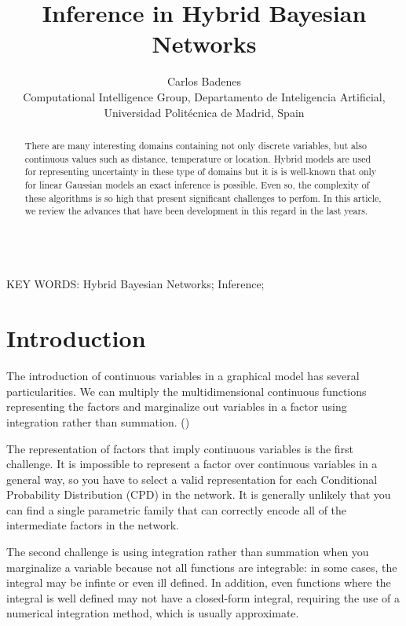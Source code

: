 \documentclass[a4paper,11pt]{article}
\begin{document}
\title{Inference in Hybrid Bayesian Networks}

\author{{Carlos Badenes}\\
{\small Computational Intelligence Group, Departamento de Inteligencia Artificial, Universidad Polit\'ecnica de Madrid, Spain}}

\date{}
\maketitle



\begin{abstract} There are many interesting domains containing not only discrete variables, but also continuous values such as distance, temperature or location. Hybrid models are used for representing uncertainty in these type of domains but it is is well-known that only for linear Gaussian models an exact inference is possible. Even so, the complexity of these algorithms is so high that present significant challenges to perfom. In this article, we review the advances that have been development in this regard in the last years.
\end{abstract}


\ \\
KEY WORDS: Hybrid Bayesian Networks; Inference;




\section{Introduction}

The introduction of continuous variables in a graphical model has several particularities. We can multiply the multidimensional continuous functions representing the factors and marginalize out variables in a factor using integration rather than summation. (\cite{probabilisticModel2009}) 

The representation of factors that imply continuous variables is the first challenge. It is impossible to represent a factor over continuous variables in a general way, so you have to select a valid representation for each Conditional Probability Distribution (CPD) in the network. It is generally unlikely that you can find a single parametric family that can correctly encode all of the intermediate factors in the network.

The second challenge is using integration rather than summation when you marginalize a variable because not all functions are integrable: in some cases, the integral may be infinte or even ill defined. In addition, even functions where the integral is well defined may not have a closed-form integral, requiring the use of a numerical integration method, which is usually approximate.
\end{document}
